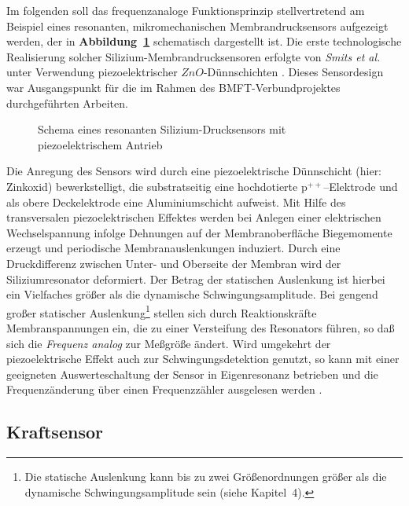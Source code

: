 Im folgenden soll das frequenzanaloge Funktionsprinzip stellvertretend
am Beispiel eines resonanten, mikromechanischen Membrandrucksensors
aufgezeigt werden, der in {\bf Abbildung~\ref{abbdrucksensor}}
schematisch dargestellt ist. Die erste technologische Realisierung
solcher Silizium-Membrandrucksensoren erfolgte von {\em Smits et al.}
unter Verwendung piezoelektrischer $ZnO$-Dünnschichten \cite{Smi83}.
Dieses Sensordesign war Ausgangspunkt für die im Rahmen des
BMFT-Verbundprojektes durchgeführten Arbeiten.
\begin{figure}[htb]
\begin{center}

\setdruckse
\end{center}
 \caption{\label{abbdrucksensor}
 Schema eines resonanten Silizium-Drucksensors mit piezoelektrischem Antrieb}
\end{figure}
Die Anregung des Sensors wird durch eine piezoelektrische Dünnschicht
(hier: Zinkoxid)
bewerkstelligt, die substratseitig eine hochdotierte p$^{++}$--Elektrode
und als obere Deckelektrode eine Aluminiumschicht aufweist.
Mit Hilfe des transversalen piezoelektrischen
Effektes werden bei Anlegen einer elektrischen Wechselspannung infolge
Dehnungen auf der Membranoberfläche Biegemomente erzeugt und perio\-dische
Membranauslenkungen induziert. Durch eine Druckdifferenz zwischen Unter-
und Oberseite der Membran wird der Siliziumresonator deformiert. Der Betrag
der statischen Auslenkung ist hierbei ein Vielfaches größer als die
dynamische Schwingungsamplitude. Bei gengend großer statischer
Auslenkung\footnote{Die statische Auslenkung kann bis zu zwei
Größenordnungen größer als die dynamische Schwingungsamplitude sein
(siehe Kapitel~4).} stellen sich durch Reaktionskräfte
Membranspannungen ein, die zu einer Versteifung des Resonators führen,
so daß sich die {\em Frequenz analog} zur Meßgröße ändert. Wird
umgekehrt der piezoelektrische Effekt auch zur Schwingungsdetektion
genutzt, so kann mit einer geeigneten Auswerteschaltung der Sensor in
Eigenresonanz betrieben und die Frequenzänderung über einen Frequenzzähler
ausgelesen werden \cite{Fun93}.


\subsection{Kraftsensor}
\label{kraftsensor}

